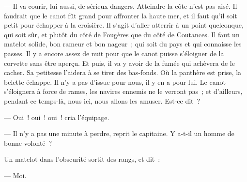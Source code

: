 \documentclass[french,twoside]{book} %
\begin{document}
— Il va courir, lui aussi, de sérieux dangers. Atteindre la côte n’est pas aisé. Il faudrait que le canot fût grand pour affronter la haute mer, et il faut qu’il soit petit pour échapper à la croisière. Il s’agit d’aller atterrir à un point quelconque, qui soit sûr, et plutôt du côté de Fougères que du côté de Coutances. Il faut un matelot solide, bon rameur et bon nageur ; qui soit du pays et qui connaisse les passes. Il y a encore assez de nuit pour que le canot puisse s’éloigner de la corvette sans être aperçu. Et puis, il va y avoir de  la fumée qui achèvera de le cacher. Sa petitesse l’aidera à se tirer des bas-fonds. Où la panthère est prise, la belette échappe. Il n’y a pas d’issue pour nous, il y en a pour lui. Le canot s’éloignera à force de rames, les navires ennemis ne le verront pas ; et d’ailleurs, pendant ce temps-là, nous ici, nous allons les amuser. Est-ce dit ?\par
— Oui ! oui ! oui ! cria l’équipage.\par
— Il n’y a pas une minute à perdre, reprit le capitaine. Y a-t-il un homme de bonne volonté ?\par
Un matelot dans l’obscurité sortit des rangs, et dit :\par
— Moi.
\end{document}
